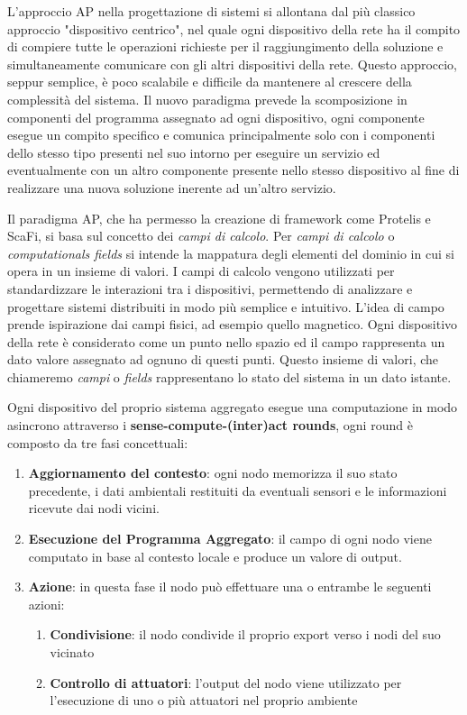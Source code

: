 \documentclass[12pt,a4paper,openright,twoside]{book}
\begin{document}
L'approccio \ac{AP} nella progettazione di sistemi si allontana dal più classico approccio "dispositivo centrico", nel quale ogni dispositivo della rete ha il compito di compiere tutte le operazioni richieste per il raggiungimento della soluzione e simultaneamente comunicare con gli altri dispositivi della rete. Questo approccio, seppur semplice, è poco scalabile e difficile da mantenere al crescere della complessità del sistema. Il nuovo paradigma prevede la scomposizione in componenti del programma assegnato ad ogni dispositivo, ogni componente esegue un compito specifico e comunica principalmente solo con i componenti dello stesso tipo presenti nel suo intorno per eseguire un servizio ed eventualmente con un altro componente presente nello stesso dispositivo al fine di realizzare una nuova soluzione inerente ad un'altro servizio. 

Il paradigma \ac{AP}, che ha permesso la creazione di framework come Protelis e ScaFi, si basa sul concetto dei \textit{campi di calcolo}. Per \textit{campi di calcolo} o \textit{computationals fields} si intende la mappatura degli elementi del dominio in cui si opera in un insieme di valori.
I campi di calcolo vengono utilizzati per standardizzare le interazioni tra i dispositivi, permettendo di analizzare e progettare sistemi distribuiti in modo più semplice e intuitivo. L'idea di campo prende ispirazione dai campi fisici, ad esempio quello magnetico. Ogni dispositivo della rete è considerato come un punto nello spazio ed il campo rappresenta un dato valore assegnato ad ognuno di questi punti. Questo insieme di valori, che chiameremo \textit{campi} o \textit{fields} rappresentano lo stato del sistema in un dato istante.

Ogni dispositivo del proprio sistema aggregato esegue una computazione in modo asincrono attraverso i \textbf{sense-compute-(inter)act rounds}, ogni round è composto da tre fasi concettuali:

\begin{enumerate}
    \item \textbf{Aggiornamento del contesto}: ogni nodo memorizza il suo stato precedente, i dati ambientali restituiti da eventuali sensori e le informazioni ricevute dai nodi vicini.
    \item \textbf{Esecuzione del Programma Aggregato}: il campo di ogni nodo viene computato in base al contesto locale e produce un valore di output.
    \item \textbf{Azione}: in questa fase il nodo può effettuare una o entrambe le seguenti azioni:
    \begin{enumerate}
        \item \textbf{Condivisione}: il nodo condivide il proprio export verso i nodi del suo vicinato
        \item \textbf{Controllo di attuatori}: l'output del nodo viene utilizzato per l'esecuzione di uno o più attuatori nel proprio ambiente
    \end{enumerate}
\end{enumerate}
\end{document}
